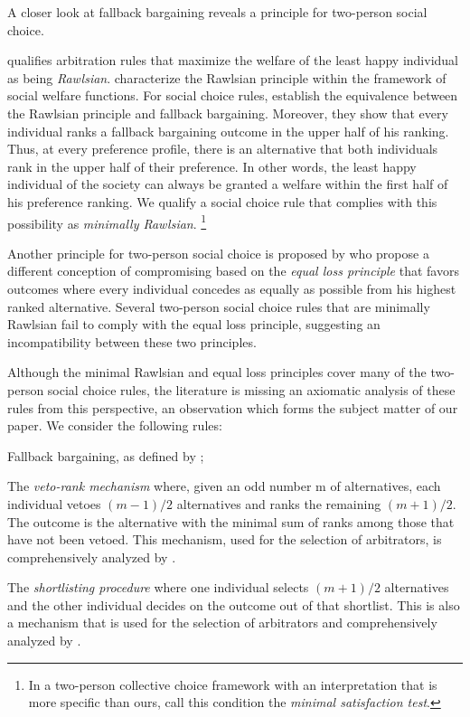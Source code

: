 \documentclass[version=3.21, pagesize, twoside=off, bibliography=totoc, DIV=calc, fontsize=12pt, a4paper]{scrartcl}
\begin{document}
A closer look at fallback bargaining reveals a principle for two-person social choice.

\cite{Sprumont1993} qualifies arbitration rules that maximize the welfare of the least happy individual as being \textit{Rawlsian}. \cite{congar2012characterization} characterize the Rawlsian principle within the framework of social welfare functions. For social choice rules, \cite{BramsKilgour2001} establish the equivalence between the Rawlsian principle and fallback bargaining. Moreover, they show that every individual ranks a fallback bargaining outcome in the upper half of his ranking. Thus, at every preference profile, there is an alternative that both individuals rank in the upper half of their preference. In other words, the least happy individual of the society can always be granted a welfare within the first half of his preference ranking. We qualify a social choice rule that complies with this possibility as \textit{minimally Rawlsian}.
\footnote{In a two-person collective choice framework with an interpretation that is more specific than ours, \cite{Clippel} call this condition the \textit{minimal satisfaction test}.}

Another principle for two-person social choice is proposed by \cite{cailloux2022compromising} who propose a different conception of compromising based on the \textit{equal loss principle} that favors outcomes where every individual concedes as equally as possible from his highest ranked alternative. Several two-person social choice rules that are minimally Rawlsian fail to comply with the equal loss principle, suggesting an incompatibility between these two principles.
 
Although the minimal Rawlsian and equal loss principles cover many of the two-person social choice rules, the literature is missing an axiomatic analysis of these rules from this perspective, an observation which forms the subject matter of our paper. We consider the following rules:

Fallback bargaining, as defined by \cite{BramsKilgour2001};

The \textit{veto-rank mechanism} where, given an odd number m of alternatives, each individual vetoes $(m−1) / 2$ alternatives and ranks the remaining $(m+1) / 2$. The outcome is the alternative with the minimal sum of ranks among those that have not been vetoed. This mechanism, used for the selection of arbitrators, is comprehensively analyzed by \cite{Clippel}.


The \textit{shortlisting procedure} where one individual selects $(m+1) / 2$ alternatives and the other individual decides on the outcome out of that shortlist. This is also a mechanism that is used for the selection of arbitrators and comprehensively analyzed by \cite{Clippel}.
\end{document}

